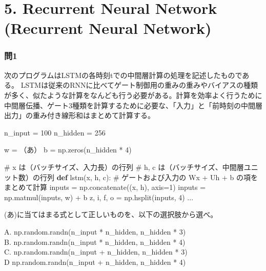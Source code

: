 \documentclass[
  letterpaper,
  DIV=11,
  numbers=noendperiod]{scrreprt}
\newenvironment{Shaded}{\begin{snugshade}}{\end{snugshade}}
\newcommand{\CommentTok}[1]{\textcolor[rgb]{0.37,0.37,0.37}{#1}}
\newcommand{\DecValTok}[1]{\textcolor[rgb]{0.68,0.00,0.00}{#1}}
\newcommand{\KeywordTok}[1]{\textcolor[rgb]{0.00,0.23,0.31}{\textbf{#1}}}
\newcommand{\NormalTok}[1]{\textcolor[rgb]{0.00,0.23,0.31}{#1}}
\newcommand{\OperatorTok}[1]{\textcolor[rgb]{0.37,0.37,0.37}{#1}}
\begin{document}
\chapter{5. Recurrent Neural Network (Recurrent Neural
Network)}\label{recurrent-neural-network-recurrent-neural-network}

\subsection{問1}\label{ux554f1-6}

次のプログラムはLSTMの各時刻tでの中間層計算の処理を記述したものである。
LSTMは従来のRNNに比べてゲート制御用の重みの重みやバイアスの種類が多く、似たような計算をなんども行う必要がある。計算を効率よく行うために中間層伝播、ゲート3種類を計算するために必要な、「入力」と「前時刻の中間層出力」の重み付き線形和はまとめて計算する。

\begin{Shaded}
\begin{Highlighting}[]
\NormalTok{n\_input }\OperatorTok{=} \DecValTok{100}  
\NormalTok{n\_hidden }\OperatorTok{=} \DecValTok{256}

\NormalTok{w }\OperatorTok{=}\NormalTok{ （あ）  }
\NormalTok{b }\OperatorTok{=}\NormalTok{ np.zeros(n\_hidden }\OperatorTok{*} \DecValTok{4}\NormalTok{)}

\CommentTok{\# x は（バッチサイズ、入力長）の行列  }
\CommentTok{\# h, c は（バッチサイズ、中間層ユニット数）の行列  }
\KeywordTok{def}\NormalTok{ lstm(x, h, c):  }
    \CommentTok{\# ゲートおよび入力の Wx + Uh + b の項をまとめて計算  }
\NormalTok{    inputs }\OperatorTok{=}\NormalTok{ np.concatenate((x, h), axis}\OperatorTok{=}\DecValTok{1}\NormalTok{)  }
\NormalTok{    inputs }\OperatorTok{=}\NormalTok{ np.matmul(inputs, w) }\OperatorTok{+}\NormalTok{ b  }
\NormalTok{    z, i, f, o }\OperatorTok{=}\NormalTok{ np.hsplit(inputs, }\DecValTok{4}\NormalTok{)  }
\NormalTok{    ...}
\end{Highlighting}
\end{Shaded}

(あ)に当てはまる式として正しいものを、以下の選択肢から選べ。

A. np.random.randn(n\_input * n\_hidden, n\_hidden * 3)\\
B. np.random.randn(n\_input * n\_hidden, n\_hidden * 4)\\
C. np.random.randn(n\_input + n\_hidden, n\_hidden * 3)\\
D np.random.randn(n\_input + n\_hidden, n\_hidden * 4)
\end{document}
